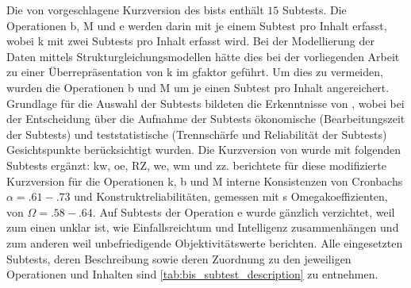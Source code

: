 \documentclass[11pt, twoside, a4paper]{book}		%
\begin{document}
Die von \citet{Jaeger1997} vorgeschlagene Kurzversion des \gls{bist}s enthält $15$ Subtests. Die Operationen \gls{b}, \gls{M} und \gls{e} werden darin mit je einem Subtest pro Inhalt erfasst, wobei \gls{k} mit zwei Subtests pro Inhalt erfasst wird. Bei der Modellierung der Daten mittels Strukturgleichungsmodellen hätte dies bei der vorliegenden Arbeit zu einer Überrepräsentation von \gls{k} im \gls{gfaktor} geführt. Um dies zu vermeiden, wurden die Operationen \gls{b} und \gls{M} um je einen Subtest pro Inhalt angereichert. Grundlage für die Auswahl der Subtests bildeten die Erkenntnisse von \citet{Wicki2014}, wobei bei der Entscheidung über die Aufnahme der Subtests ökonomische (Bearbeitungszeit der Subtests) und teststatistische (Trennschärfe und Reliabilität der Subtests)  Gesichtspunkte berücksichtigt wurden. Die Kurzversion von \citet{Jaeger1997} wurde mit folgenden Subtests ergänzt: \gls{kw}, \gls{oe}, \gls{RZ}, \gls{we}, \gls{wm} und \gls{zz}. 
\citet{Wicki2014} berichtete für diese modifizierte Kurzversion für die Operationen \gls{k}, \gls{b} und \gls{M} interne Konsistenzen von Cronbachs $\alpha=.61-.73$ und Konstruktreliabilitäten, gemessen mit \citeauthor{McDonald1999}s \citeyearpar{McDonald1999} Omegakoeffizienten, von $\Omega = .58-.64$.
Auf Subtests der Operation \gls{e} wurde gänzlich verzichtet, weil zum einen unklar ist, wie Einfallsreichtum und Intelligenz zusammenhängen \citep{Kim2005} und zum anderen weil \citet{Jaeger1997} unbefriedigende Objektivitätswerte berichten. 
Alle eingesetzten Subtests, deren Beschreibung sowie deren Zuordnung zu den jeweiligen Operationen und Inhalten sind \autoref{tab:bis_subtest_description} zu entnehmen.
\end{document}
